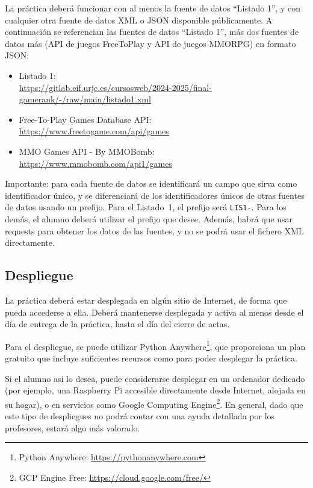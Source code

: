 La práctica deberá funcionar con al menos la fuente de datos ``Listado 1'', y con cualquier otra fuente de datos XML o JSON disponible públicamente. A continuación se referencian las fuentes de datos ``Listado 1'', más dos fuentes de datos más (API de juegos FreeToPlay y API de juegos MMORPG) en formato JSON:

\begin{itemize}
\item Listado 1: \\
  \url{https://gitlab.eif.urjc.es/cursosweb/2024-2025/final-gamerank/-/raw/main/listado1.xml}
\item Free-To-Play Games Database API: \\
  \url{https://www.freetogame.com/api/games}
\item MMO Games API - By MMOBomb: \\
  \url{https://www.mmobomb.com/api1/games}
\end{itemize}

Importante: para cada fuente de datos se identificará un campo que sirva como identificador único, y se diferenciará de los identificadores únicos de otras fuentes de datos usando un prefijo. Para el Listado~1, el prefijo será \verb|LIS1-|. Para los demás, el alumno deberá utilizar el prefijo que desee. Además, habrá que usar requests para obtener los datos de las fuentes, y no se podrá usar el fichero XML directamente.

\subsection{Despliegue}
\label{sec:practica-2025-05:despliegue}

La práctica deberá estar desplegada en algún sitio de Internet, de forma que pueda accederse a ella. Deberá mantenerse desplegada y activa al menos desde el día de entrega de la práctica, hasta el día del cierre de actas.

Para el despliegue, se puede utilizar Python Anywhere\footnote{Python Anywhere: \url{https://pythonanywhere.com}}, que proporciona un plan gratuito que incluye suficientes recursos como para poder desplegar la práctica.

Si el alumno así lo desea, puede considerarse desplegar en un ordenador dedicado (por ejemplo, una Raspberry Pi accesible directamente desde Internet, alojada en su hogar), o en servicios como Google Computing Engine\footnote{GCP Engine Free: \url{https://cloud.google.com/free/}}. En general, dado que este tipo de despliegues no podrá contar con una ayuda detallada por los profesores, estará algo más valorado.

